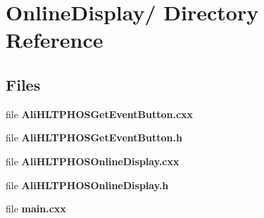 \section{Online\-Display/ Directory Reference}
\label{dir_000001}


\subsection*{Files}
\begin{CompactItemize}
\item 
file {\bf Ali\-HLTPHOSGet\-Event\-Button.cxx}
\item 
file {\bf Ali\-HLTPHOSGet\-Event\-Button.h}
\item 
file {\bf Ali\-HLTPHOSOnline\-Display.cxx}
\item 
file {\bf Ali\-HLTPHOSOnline\-Display.h}
\item 
file {\bf main.cxx}
\end{CompactItemize}
